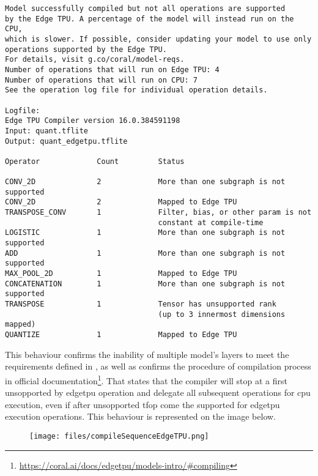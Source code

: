 {\begin{lstlisting}
Model successfully compiled but not all operations are supported
by the Edge TPU. A percentage of the model will instead run on the CPU,
which is slower. If possible, consider updating your model to use only
operations supported by the Edge TPU.
For details, visit g.co/coral/model-reqs.
Number of operations that will run on Edge TPU: 4
Number of operations that will run on CPU: 7
See the operation log file for individual operation details.

Logfile:
Edge TPU Compiler version 16.0.384591198
Input: quant.tflite
Output: quant_edgetpu.tflite

Operator             Count         Status
      
CONV_2D              2             More than one subgraph is not supported
CONV_2D              2             Mapped to Edge TPU
TRANSPOSE_CONV       1             Filter, bias, or other param is not
                                   constant at compile-time
LOGISTIC             1             More than one subgraph is not supported
ADD                  1             More than one subgraph is not supported
MAX_POOL_2D          1             Mapped to Edge TPU
CONCATENATION        1             More than one subgraph is not supported
TRANSPOSE            1             Tensor has unsupported rank
                                   (up to 3 innermost dimensions mapped)
QUANTIZE             1             Mapped to Edge TPU
\end{lstlisting}


This behaviour confirms the inability of multiple model's layers to meet the requirements defined in ,
as well as confirms the procedure of compilation process in official documentation\footnote{\url{https://coral.ai/docs/edgetpu/models-intro/\#compiling}}.
That states that the compiler will stop at a first unsopported by \gls{edgetpu} operation and delegate all subsequent operations for \gls{cpu} execution,
even if after unsopported \gls{tfop} come the supported for \gls{edgetpu} execution operations. This behaviour is represented on the image below.

\begin{figure}[htbp]
  \centering
  \texttt{[image: files/compileSequenceEdgeTPU.png]}


\end{figure}}
